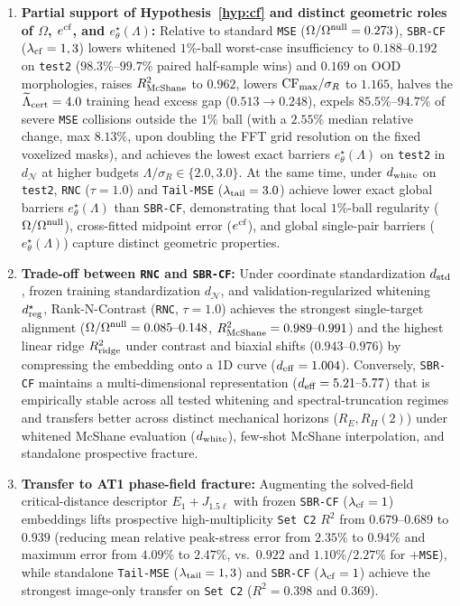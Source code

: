 \documentclass[preprint,11pt,a4paper]{elsarticle}
\newcommand{\ecf}{e^{\rm cf}}
\begin{document}
\begin{enumerate}
    \item \textbf{Partial support of Hypothesis~\ref{hyp:cf} and distinct geometric roles of $\Omega$, $\ecf$, and $e^\star_\theta(\Lambda)$:} Relative to standard \texttt{MSE} ($\Omega/\Omega^{\rm null}=0.273$), \texttt{SBR-CF} ($\lambda_{\rm cf}=1,3$) lowers whitened $1\%$-ball worst-case insufficiency to $0.188\text{--}0.192$ on \texttt{test2} ($98.3\%\text{--}99.7\%$ paired half-sample wins) and $0.169$ on OOD morphologies, raises $R^2_{\rm McShane}$ to $0.962$, lowers ${\rm CF}_{\max}/\sigma_R$ to $1.165$, halves the $\widetilde\Lambda_{\rm cert}=4.0$ training head excess gap ($0.513\to 0.248$), expels $85.5\%\text{--}94.7\%$ of severe \texttt{MSE} collisions outside the $1\%$ ball (with a $2.55\%$ median relative change, max $8.13\%$, upon doubling the FFT grid resolution on the fixed voxelized masks), and achieves the lowest exact barriers $e^\star_\theta(\Lambda)$ on \texttt{test2} in $d_{\mathcal N}$ at higher budgets $\Lambda/\sigma_R\in\{2.0,3.0\}$. At the same time, under $d_{\rm white}$ on \texttt{test2}, \texttt{RNC} ($\tau=1.0$) and \texttt{Tail-MSE} ($\lambda_{\rm tail}=3.0$) achieve lower exact global barriers $e^\star_\theta(\Lambda)$ than \texttt{SBR-CF}, demonstrating that local $1\%$-ball regularity ($\Omega/\Omega^{\rm null}$), cross-fitted midpoint error ($\ecf$), and global single-pair barriers ($e^\star_\theta(\Lambda)$) capture distinct geometric properties.
    \item \textbf{Trade-off between \texttt{RNC} and \texttt{SBR-CF}:} Under coordinate standardization $d_{\rm std}$, frozen training standardization $d_{\mathcal N}$, and validation-regularized whitening $d_{\rm reg}^\star$, Rank-N-Contrast (\texttt{RNC}, $\tau=1.0$) achieves the strongest single-target alignment ($\Omega/\Omega^{\rm null}=0.085\text{--}0.148$, $R^2_{\rm McShane}=0.989\text{--}0.991$) and the highest linear ridge $R^2_{\rm ridge}$ under contrast and biaxial shifts ($0.943\text{--}0.976$) by compressing the embedding onto a 1D curve ($d_{\rm eff}=1.004$). Conversely, \texttt{SBR-CF} maintains a multi-dimensional representation ($d_{\rm eff}=5.21\text{--}5.77$) that is empirically stable across all tested whitening and spectral-truncation regimes and transfers better across distinct mechanical horizons ($R_E, R_H(2)$) under whitened McShane evaluation ($d_{\rm white}$), few-shot McShane interpolation, and standalone prospective fracture.
    \item \textbf{Transfer to AT1 phase-field fracture:} Augmenting the solved-field critical-distance descriptor $E_1+J_{1.5\ell}$ with frozen \texttt{SBR-CF} ($\lambda_{\rm cf}=1$) embeddings lifts prospective high-multiplicity \texttt{Set C2} $R^2$ from $0.679\text{--}0.689$ to $0.939$ (reducing mean relative peak-stress error from $2.35\%$ to $0.94\%$ and maximum error from $4.09\%$ to $2.47\%$, vs.\ $0.922$ and $1.10\%/2.27\%$ for $+$\texttt{MSE}), while standalone \texttt{Tail-MSE} ($\lambda_{\rm tail}=1,3$) and \texttt{SBR-CF} ($\lambda_{\rm cf}=1$) achieve the strongest image-only transfer on \texttt{Set C2} ($R^2=0.398$ and $0.369$).
\end{enumerate}
\end{document}
